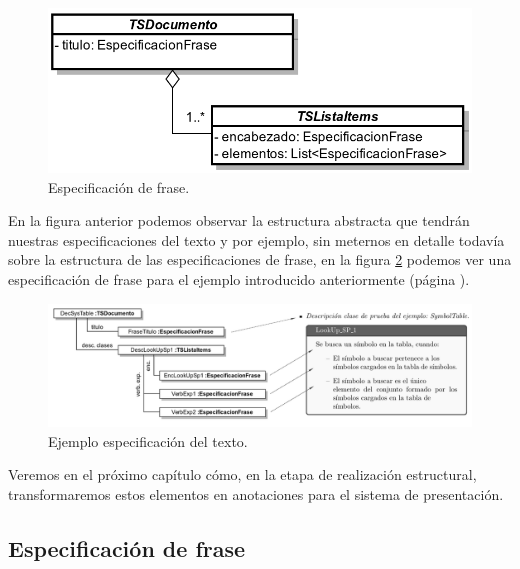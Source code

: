 \begin{figure}[H]
  	\centering
	\includegraphics[scale=0.3]{img/text_spec.png}
	\caption{Especificación de frase.}
  	\label{fig:text_spec}
\end{figure}

En la figura anterior podemos observar la estructura abstracta que tendrán nuestras especificaciones del texto y por ejemplo, sin meternos en detalle todavía sobre la estructura de las especificaciones de frase, en la figura \ref{fig:text_spec_ej} podemos ver una especificación de frase para el ejemplo introducido anteriormente (página \pageref{fig:ej_corpus}).

\begin{figure}[H]
  	\centering
	\includegraphics[scale=0.35]{img/ej_text_spec.png}
	\caption{Ejemplo especificación del texto.}
  \label{fig:text_spec_ej}
\end{figure}

Veremos en el próximo capítulo cómo, en la etapa de realización estructural, transformaremos estos elementos en anotaciones para el sistema de presentación.

\subsection{Especificación de frase}


